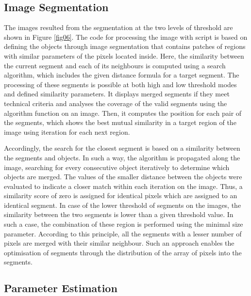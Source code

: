\documentclass[analytics,article,accept,pdftex,moreauthors]{Definitions/mdpi}
\begin{document}
\subsection{Image Segmentation}
The images resulted from the segmentation at the two levels of threshold are shown in Figure \ref{fig06}. The code for processing the image with script is based on defining the objects through image segmentation that contains patches of regions with similar parameters of the pixels located inside. Here, the similarity between the current segment and each of its neighbours is computed using a search algorithm, which includes the given distance formula for a target segment. The processing of these segments is possible at both high and low threshold modes and defined similarity parameters. It displays merged segments if they meet technical criteria and analyses the coverage of the valid segments using the algorithm function on an image. Then, it computes the position for each pair of the segments, which shows the best mutual similarity in a target region of the image using iteration for each next region. 

Accordingly, the search for the closest segment is based on a similarity between the segments and objects. In such a way, the algorithm is propagated along the image, searching for every consecutive object iteratively to determine which objects are merged. The values of the smaller distance between the objects were evaluated to indicate a closer match within each iteration on the image. Thus, a similarity score of zero is assigned for identical pixels which are assigned to an identical segment. In case of the lower threshold of segments on the images, the similarity between the two segments is lower than a given threshold value. In such a case, the combination of these region is performed using the minimal size parameter. According to this principle, all the segments with a lesser number of pixels are merged with their similar neighbour. Such an approach enables the optimisation of  segments through the distribution of the array of pixels into the segments. %

\subsection{Parameter Estimation}
\end{document}
